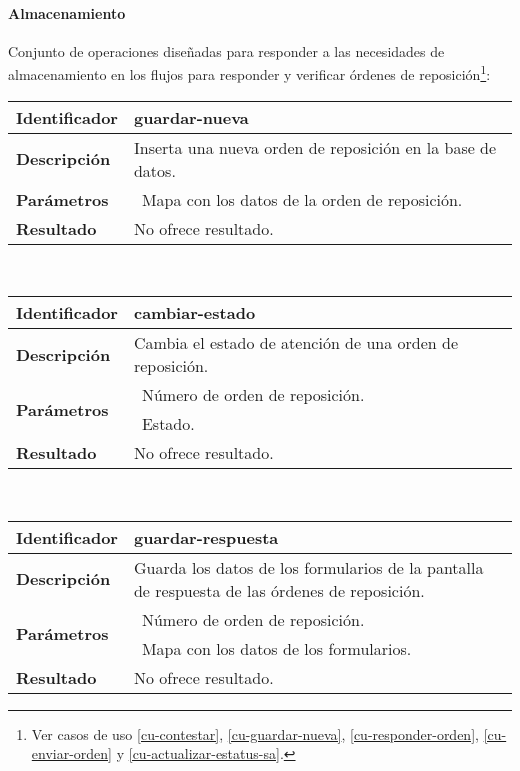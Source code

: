 \paragraph{Almacenamiento\\}
Conjunto de operaciones diseñadas para responder a las necesidades de almacenamiento en los flujos para responder y verificar órdenes de reposición\footnote{Ver casos de uso \ref{cu-contestar}, \ref{cu-guardar-nueva}, \ref{cu-responder-orden}, \ref{cu-enviar-orden} y \ref{cu-actualizar-estatus-sa}.}:
	\vspace{5mm}\\
	\begin{tabular}{|p{}|p{}|}
		\hline
		\textbf{Identificador}	& \textbf{guardar-nueva} \\
		\hline
		\hline
		\textbf{Descripción}	& Inserta una nueva orden de reposición en la base de datos.\\
		\hline
		\textbf{Parámetros} 	& \textbullet\, Mapa con los datos de la orden de reposición.\\
		\hline
		\textbf{Resultado}		& No ofrece resultado.\\
		\hline
	\end{tabular}
	\vspace{5mm}\\
	\begin{tabular}{|p{}|p{}|}
		\hline
		\textbf{Identificador}	& \textbf{cambiar-estado} \\
		\hline
		\hline
		\textbf{Descripción}	& Cambia el estado de atención de una orden de reposición. \\
		\hline
		\multirow{2}{*}{\textbf{Parámetros}}	& \textbullet\, Número de orden de reposición.\\
												& \textbullet\, Estado.\\
		\hline
		\textbf{Resultado}		& No ofrece resultado.\\
		\hline
	\end{tabular}
	\vspace{5mm}\\
	\begin{tabular}{|p{}|p{}|}
		\hline
		\textbf{Identificador}	& \textbf{guardar-respuesta}\\
		\hline
		\hline
		\textbf{Descripción}	& Guarda los datos de los formularios de la pantalla de respuesta de las órdenes de reposición.\\
		\hline
		\multirow{2}{*}{\textbf{Parámetros}}	& \textbullet\, Número de orden de reposición.\\
												& \textbullet\, Mapa con los datos de los formularios.\\
		\hline
		\textbf{Resultado}		& No ofrece resultado.\\
		\hline
	\end{tabular}
